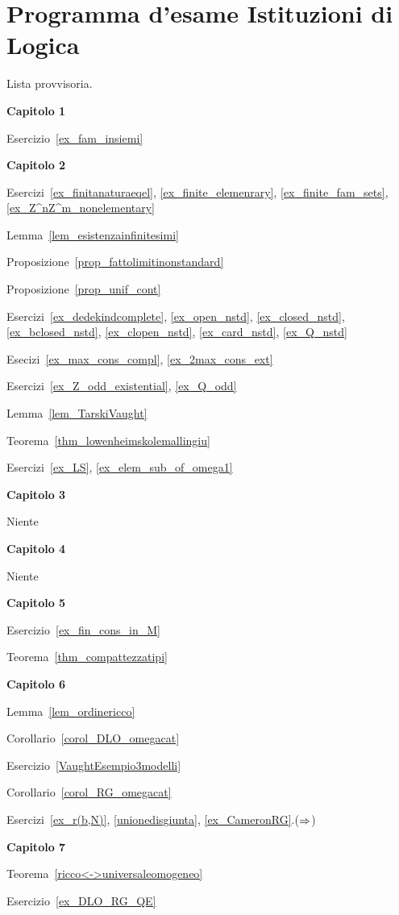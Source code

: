 \chapter*{Programma d'esame Istituzioni di Logica}\label{esame}

Lista provvisoria.

\textbf{Capitolo 1}

Esercizio~\ref{ex_fam_insiemi} 

\textbf{Capitolo 2}

Esercizi~\ref{ex_finitanaturaeqel}, \ref{ex_finite_elemenrary}, \ref{ex_finite_fam_sets}, \ref{ex_Z^nZ^m_nonelementary}

Lemma~\ref{lem_esistenzainfinitesimi}

Proposizione~\ref{prop_fattolimitinonstandard}

Proposizione~\ref{prop_unif_cont}

Esercizi~\ref{ex_dedekindcomplete}, \ref{ex_open_nstd}, \ref{ex_closed_nstd}, \ref{ex_bclosed_nstd}, \ref{ex_clopen_nstd}, \ref{ex_card_nstd}, \ref{ex_Q_nstd}

Esecizi~\ref{ex_max_cons_compl}, \ref{ex_2max_cons_ext}

Esercizi~\ref{ex_Z_odd_existential}, \ref{ex_Q_odd}

Lemma~\ref{lem_TarskiVaught}

Teorema~\ref{thm_lowenheimskolemallingiu}

Esercizi~\ref{ex_LS}, \ref{ex_elem_sub_of_omega1}

\textbf{Capitolo 3}

Niente


\textbf{Capitolo 4}

Niente

\textbf{Capitolo 5}

Esercizio~\ref{ex_fin_cons_in_M}

Teorema~\ref{thm_compattezzatipi}

\textbf{Capitolo 6}

Lemma~\ref{lem_ordinericco}

Corollario~\ref{corol_DLO_omegacat}

Esercizio~\ref{VaughtEsempio3modelli}

Corollario~\ref{corol_RG_omegacat}

Esercizi~\ref{ex_r(b,N)}, \ref{unionedisgiunta}, \ref{ex_CameronRG}.($\Rightarrow$) 

\textbf{Capitolo 7}

Teorema~\ref{ricco<->universaleomogeneo}

Esercizio~\ref{ex_DLO_RG_QE}